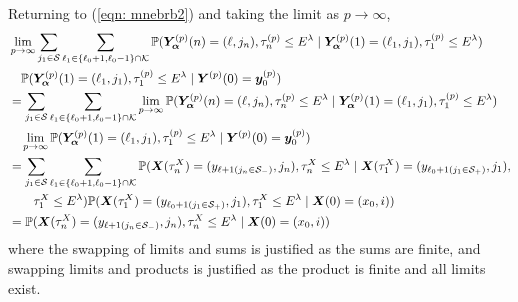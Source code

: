 Returning to (\ref{eqn: mnebrb2}) and taking the limit as \(p\to \infty \),  
\begin{align}
	&\lim_{p\to\infty}\sum_{j_1\in\mathcal S}\sum_{\ell_1\in\{\ell_0+1,\ell_0-1\}\cap \mathcal K}\mathbb P(\bm{Y}_{\bm{\alpha}}^{(p)}(n) = (\ell, j_n), \tau_{n}^{(p)}\leq E^\lambda 
	 \mid \bm{Y}_{\bm{\alpha}}^{(p)}(1)=(\ell_1,j_1), \tau_{1}^{(p)}\leq E^{\lambda}) \nonumber 
	 \\& \quad\mathbb P(\bm{Y}_{\bm{\alpha}}^{(p)}(1)=(\ell_1, j_1), \tau_{1}^{(p)}\leq E^\lambda
	 \mid \boldsymbol Y^{(p)}(0)=\boldsymbol y_0^{(p)}) \nonumber
	 \\&= \sum_{j_1\in\mathcal S}\sum_{\ell_1\in\{\ell_0+1,\ell_0-1\}\cap \mathcal K} \lim_{p\to\infty} \mathbb P(\bm{Y}_{\bm{\alpha}}^{(p)}(n) = (\ell, j_n), \tau_{n}^{(p)}\leq E^\lambda 
	 \mid \bm{Y}_{\bm{\alpha}}^{(p)}(1)=(\ell_1, j_1), \tau_1^{(p)}\leq E^\lambda) \nonumber
	 \\& \quad\lim_{p\to\infty}\mathbb P(\bm{Y}_{\bm{\alpha}}^{(p)}(1)=(\ell_1, j_1), \tau_{1}^{(p)}\leq E^\lambda
	 \mid \boldsymbol Y^{(p)}(0)=\boldsymbol y_0^{(p)})\nonumber
	 \\&= \sum_{j_1\in\mathcal S}\sum_{\ell_1\in\{\ell_0+1,\ell_0-1\}\cap \mathcal K} \mathbb P(\boldsymbol X(\tau_n^X) = (y_{\ell+1(j_{n}\in\mathcal S_-)}, 
		j_n), \tau_{n}^X\leq E^\lambda \mid \nonumber
		\boldsymbol X(\tau_1^X)=(y_{\ell_{0}+1(j_{1}\in\mathcal S_+)},
		j_{1}),
		\\&\qquad{}\tau_1^X\leq E^\lambda) \nonumber
	 \mathbb P(\boldsymbol X(\tau_1^X)=(y_{\ell_{0}+1(j_{1}\in\mathcal S_+)},
		j_{1}),\tau_1^X\leq E^\lambda
		\mid \boldsymbol X(0)=(x_0, i)) \nonumber
	\\&=\mathbb P(\boldsymbol X(\tau_n^X) = (y_{\ell+1(j_{n}\in\mathcal S_-)}, 
		j_n), \tau_{n}^X\leq E^\lambda
		\mid \boldsymbol X(0)=(x_0, i))
	 \label{eqn: mnebrb22}
\end{align}
where the swapping of limits and sums is justified as the sums are finite, and swapping limits and products is justified as the product is finite and all limits exist. 

